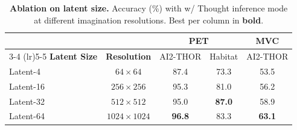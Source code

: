\begin{table}[t]
  \caption{\textbf{Ablation on latent size.} Accuracy (\%) with w/ Thought inference mode at different imagination resolutions. Best per column in \textbf{bold}.}
  \vspace{-1em}
  \centering
  \setlength{\tabcolsep}{6pt}
  \small
  \begin{tabular}{l c cc c}
    \toprule
    & & \multicolumn{2}{c}{\textbf{PET}} & \textbf{MVC} \\
    \cmidrule(lr){3-4} \cmidrule(lr){5-5}
    \textbf{Latent Size} & \textbf{Resolution}
      & \footnotesize AI2-THOR & \footnotesize Habitat
      & \footnotesize AI2-THOR \\
    \midrule
    Latent-4  & $64\times64$     & 87.4 & 73.3 & 53.5 \\
    Latent-16 & $256\times256$   & 95.3 & 81.0 & 56.2 \\
    Latent-32 & $512\times512$   & 95.0 & \textbf{87.0} & 58.9 \\
    Latent-64 & $1024\times1024$ & \textbf{96.8} & 83.3 & \textbf{63.1} \\
    \bottomrule
  \end{tabular}
  \label{tab:ablation_latent}
\end{table}